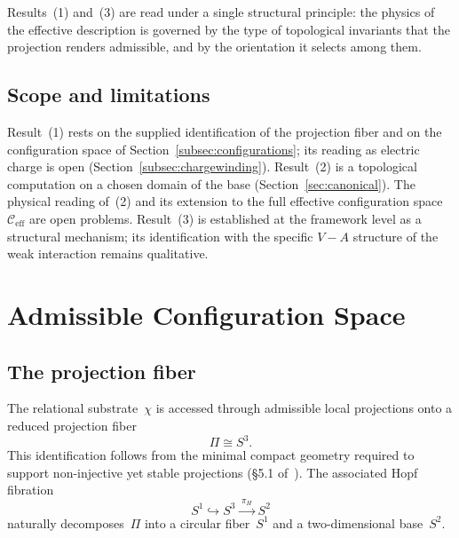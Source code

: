 \documentclass[11pt,a4paper]{article}
\newcommand{\Ceff}{\mathcal{C}_{\mathrm{eff}}}
\begin{document}
      Results~(1) and~(3) are read under a single structural principle:
      the physics of the effective description is governed by the type of
      topological invariants that the projection renders admissible, and
      by the orientation it selects among them.

    \subsection{Scope and limitations}

      Result~(1) rests on the supplied identification of the projection
      fiber and on the configuration space of Section~\ref{subsec:configurations};
      its reading as electric charge is open (Section~\ref{subsec:chargewinding}).
      Result~(2) is a topological computation on a chosen domain of
      the base (Section~\ref{sec:canonical}).
      The physical reading of~(2) and its extension to the full effective
      configuration space~$\Ceff$ are open problems.
      Result~(3) is established at the framework level as a structural
      mechanism; its identification with the specific $V{-}A$ structure of the
      weak interaction remains qualitative.

  \section{Admissible Configuration Space}
    \label{sec:admissible}

    \subsection{The projection fiber}

      The relational substrate~$\chi$ is accessed through admissible local
      projections onto a reduced projection fiber~\cite{Cosmochrony}
      \begin{equation}
        \label{eq:fiber}
        \Pi \cong S^3.
      \end{equation}
      This identification follows from the minimal compact geometry required
      to support non-injective yet stable projections
      (\S5.1 of~\cite{Cosmochrony}).
      The associated Hopf fibration
      \begin{equation}
        \label{eq:hopf}
        S^1 \hookrightarrow S^3 \xrightarrow{\;\pi_H\;} S^2
      \end{equation}
      naturally decomposes~$\Pi$ into a circular fiber~$S^1$ and a
      two-dimensional base~$S^2$.
\end{document}
